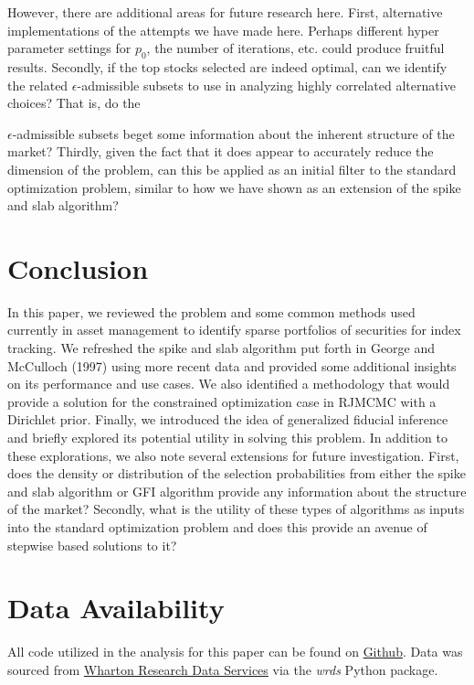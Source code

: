 \documentclass[a4paper, 12pt]{article}
\theoremstyle{plain}
\theoremstyle{definition}
\theoremstyle{remark}
\begin{document}
However, there are additional areas for future research here. First, alternative implementations of the attempts we have made here. Perhaps different hyper parameter settings for $p_0$, the number of iterations, etc. could produce fruitful results. Secondly, if the top stocks selected are indeed optimal, can we identify the related $\epsilon$-admissible subsets to use in analyzing highly correlated alternative choices? That is, do the {$\epsilon$-admissible subsets beget some information about the inherent structure of the market? Thirdly, given the fact that it does appear to accurately reduce the dimension of the problem, can this be applied as an initial filter to the standard optimization problem, similar to how we have shown as an extension of the spike and slab algorithm?

\section{Conclusion}

In this paper, we reviewed the problem and some common methods used currently in asset management to identify sparse portfolios of securities for index tracking. We refreshed the spike and slab algorithm put forth in George and McCulloch (1997) using more recent data and provided some additional insights on its performance and use cases. We also identified a methodology that would provide a solution for the constrained optimization case in RJMCMC with a Dirichlet prior. Finally, we introduced the idea of generalized fiducial inference and briefly explored its  potential utility in solving this problem. In addition to these explorations, we also note several extensions for future investigation. First, does the density or distribution of the selection probabilities from either the spike and slab algorithm or GFI algorithm provide any information about the structure of the market? Secondly, what is the utility of these types of algorithms as inputs into the standard optimization problem and does this provide an avenue of stepwise based solutions to it?

\section*{Data Availability}
All code utilized in the analysis for this paper can be found on \href{https://github.com/bob-skowron/SU19-Independent-Study}{\color{blue}Github}. Data was sourced from \href{https://wrds-web.wharton.upenn.edu/wrds/}{\color{blue}Wharton Research Data Services} via the \textit{wrds} Python package.

}
\end{document}
